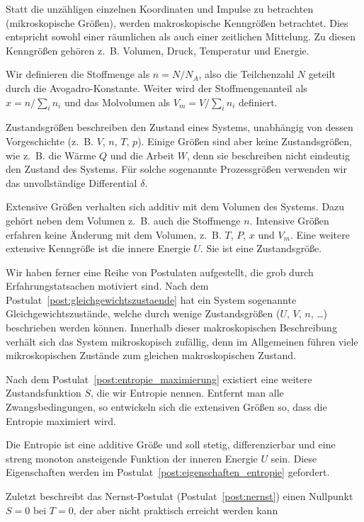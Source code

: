 \begin{summary}
    Statt die unzähligen einzelnen Koordinaten und Impulse zu betrachten (mikroskopische Größen), werden makroskopische Kenngrößen betrachtet. Dies entspricht sowohl einer räumlichen als auch einer zeitlichen Mittelung. Zu diesen Kenngrößen gehören z.~B. Volumen, Druck, Temperatur und Energie. 

    Wir definieren die Stoffmenge als $n = N/N_A$, also die Teilchenzahl $N$ geteilt durch die Avogadro-Konstante. Weiter wird der Stoffmengenanteil als $x=n/\sum_i n_i$ und das Molvolumen als $V_m = V/\sum_i n_i$ definiert. 

    Zustandsgrößen beschreiben den Zustand eines Systems, unabhängig von dessen Vorgeschichte (z.~B. $V$, $n$, $T$, $p$). 
    Einige Größen sind aber keine Zustandsgrößen, wie z.~B. die Wärme $Q$ und die Arbeit $W$, denn sie beschreiben nicht eindeutig den Zustand des Systems. Für solche sogenannte Prozessgrößen verwenden wir das unvollständige Differential $\delta$. 

    Extensive Größen verhalten sich additiv mit dem Volumen des Systems. Dazu gehört neben dem Volumen z.~B. auch die Stoffmenge $n$. 
    Intensive Größen erfahren keine Änderung mit dem Volumen, z.~B. $T$, $P$, $x$ und $V_m$.
    Eine weitere extensive Kenngröße ist die innere Energie $U$. Sie ist eine Zustandsgröße. 

    Wir haben ferner eine Reihe von Postulaten aufgestellt, die grob durch Erfahrungstatsachen motiviert sind. Nach dem Postulat~\ref{post:gleichgewichtszustaende} hat ein System sogenannte Gleichgewichtszustände, welche durch wenige Zustandsgrößen ($U$, $V$, $n$, \ldots) beschrieben werden können. 
    Innerhalb dieser makroskopischen Beschreibung verhält sich das System mikroskopisch zufällig, denn im Allgemeinen führen viele mikroskopischen Zustände zum gleichen makroskopischen Zustand. 

    Nach dem Postulat~\ref{post:entropie_maximierung} existiert eine weitere Zustandsfunktion $S$, die wir Entropie nennen. Entfernt man alle Zwangsbedingungen, so  entwickeln sich die extensiven Größen so, dass die Entropie maximiert wird. 

    Die Entropie ist eine additive Größe und soll stetig, differenzierbar und eine streng monoton ansteigende Funktion der inneren Energie $U$ sein. Diese Eigenschaften werden im Postulat~\ref{post:eigenschaften_entropie} gefordert. 

    Zuletzt beschreibt das Nernst-Postulat (Postulat~\ref{post:nernst}) einen Nullpunkt $S=0$ bei $T=0$, der aber nicht praktisch erreicht werden kann




\end{summary}
